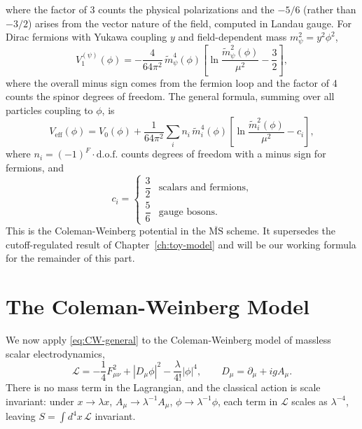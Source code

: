 where the factor of 3 counts the physical polarizations and the
$-5/6$ (rather than $-3/2$) arises from the vector nature of the field,
computed in Landau gauge. For Dirac fermions with Yukawa coupling $y$
and field-dependent mass $m_\psi^2 = y^2\phi^2$,
\begin{equation}
	V_1^{(\psi)}(\phi) = -\frac{4}{64\pi^2}\,\tilde m_\psi^4(\phi)
	\left[\ln\frac{\tilde m_\psi^2(\phi)}{\mu^2} - \frac{3}{2}\right],
\end{equation}
where the overall minus sign comes from the fermion loop and the factor
of 4 counts the spinor degrees of freedom. The general formula,
summing over all particles coupling to $\phi$, is
\begin{equation}
	V_{\text{eff}}(\phi) = V_0(\phi)
	+ \frac{1}{64\pi^2}\sum_i n_i\,\tilde m_i^4(\phi)
	\left[\ln\frac{\tilde m_i^2(\phi)}{\mu^2} - c_i\right],
	\label{eq:CW-general}
\end{equation}
where $n_i = (-1)^F\cdot\text{d.o.f.}$ counts degrees of freedom with
a minus sign for fermions, and
\begin{equation}
	c_i = \begin{cases}
		\dfrac{3}{2} & \text{scalars and fermions,} \\[6pt]
		\dfrac{5}{6} & \text{gauge bosons.}
	\end{cases}
\end{equation}
This is the Coleman-Weinberg potential in the $\overline{\text{MS}}$
scheme. It supersedes the cutoff-regulated result of
Chapter~\ref{ch:toy-model} and will be our working formula for
the remainder of this part.

\section{The Coleman-Weinberg Model}

We now apply \eqref{eq:CW-general} to the Coleman-Weinberg model of
massless scalar electrodynamics,
\begin{equation}
	\mathcal{L} = -\frac{1}{4}F_{\mu\nu}^2
	+ |D_\mu\phi|^2 - \frac{\lambda}{4!}|\phi|^4,
	\qquad D_\mu = \partial_\mu + igA_\mu.
\end{equation}
There is no mass term in the Lagrangian, and the classical action is
scale invariant: under $x\to\lambda x$, $A_\mu\to\lambda^{-1}A_\mu$,
$\phi\to\lambda^{-1}\phi$, each term in $\mathcal{L}$ scales as
$\lambda^{-4}$, leaving $S = \int d^4x\,\mathcal{L}$ invariant.

